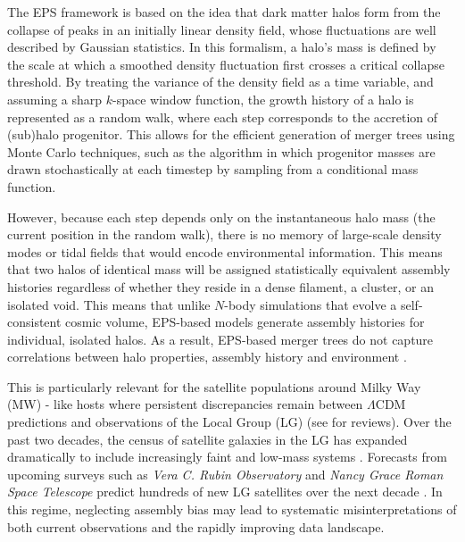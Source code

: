 The EPS framework is based on the idea that dark matter halos form from the collapse of peaks in an initially linear density field, whose fluctuations are well described by Gaussian statistics. In this formalism, a halo’s mass is defined by the scale at which a smoothed density fluctuation first crosses a critical collapse threshold. By treating the variance of the density field as a time variable, and assuming a sharp $k$-space window function, the growth history of a halo is represented as a random walk, where each step corresponds to the accretion of (sub)halo progenitor. This allows for the efficient generation of merger trees using Monte Carlo techniques, such as the \cite{Parkinson.etal.08} algorithm in which progenitor masses are drawn stochastically at each timestep by sampling from a conditional mass function.

However, because each step depends only on the instantaneous halo mass (the current position in the random walk), there is no memory of large-scale density modes or tidal fields that would encode environmental information. This means that two halos of identical mass will be assigned statistically equivalent assembly histories regardless of whether they reside in a dense filament, a cluster, or an isolated void. This means that unlike $N$-body simulations that evolve a self-consistent cosmic volume, EPS-based models generate assembly histories for individual, isolated halos. As a result, EPS-based merger trees do not capture correlations between halo properties, assembly history and environment \cite{Gao.etal.05, Zentner.07, Ma.etal.11, Zhang.etal.14}. 

This is particularly relevant for the satellite populations around Milky Way (MW) - like hosts where persistent discrepancies remain between $\Lambda$CDM predictions and observations of the Local Group (LG) (see \citealt{Bullock.BoylanKolchin.17, Sales.etal.22} for reviews). Over the past two decades, the census of satellite galaxies in the LG has expanded dramatically to include increasingly faint and low-mass systems \citep{Simon.19}. Forecasts from upcoming surveys such as \textit{Vera C. Rubin Observatory} and \textit{Nancy Grace Roman Space Telescope} predict hundreds of new LG satellites over the next decade \citep{Tan.etal.2026}. In this regime, neglecting assembly bias may lead to systematic misinterpretations of both current observations and the rapidly improving data landscape.

